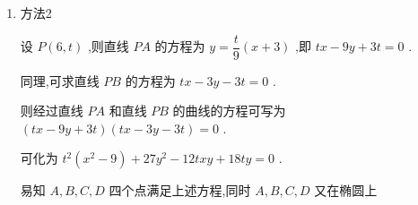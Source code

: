 \begin{enumerate}
\begin{jieda}
\begin{enumerate}
\begin{enumerate}
            联立直线和椭圆方程有$\left\{\begin{array}{l}
                 x = my+n \\
                 \dfrac{{x}^{2}}{9} + {y}^{2} = 1
            \end{array}\right.$，消去$x$有$(my+n)^2+9y^2 = 9$，即$(9+m^2)y^2+2mny+(n^2-9) = 0$

            $\Delta > 0 \Longleftrightarrow 4m^2n^2 - 4(n^2-9)(9+m^2) > 0$

            根据韦达定理有$\left\{\begin{array}{l}
                 y_1+y_2 = -\dfrac{2mn}{9+m^2} \\
                 y_1y_2 = \dfrac{n^2-9}{9+m^2}
            \end{array}\right.$
            \item 方法2

            设 $P\left( {6,t}\right)$ ,则直线 ${PA}$ 的方程为 $y = \dfrac{t}{9}\left( {x + 3}\right)$ ,即 ${tx} - {9y} + {3t} = 0$ .
            
            同理,可求直线 ${PB}$ 的方程为 ${tx} - {3y} - {3t} = 0$ .
            
            则经过直线 ${PA}$ 和直线 ${PB}$ 的曲线的方程可写为 $\left( {{tx} - {9y} + {3t}}\right) \left( {{tx} - {3y} - {3t}}\right)  = 0$ .
            
            可化为 ${t}^{2}\left( {{x}^{2} - 9}\right)  + {27}{y}^{2} - {12txy} + {18ty} = 0$ .
            
            易知 $A,B,C,D$ 四个点满足上述方程,同时 $A,B,C,D$ 又在椭圆上
            

\end{enumerate}
\end{enumerate}
\end{jieda}
\end{enumerate}

